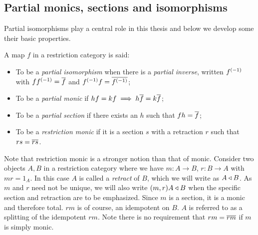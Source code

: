 \subsection{Partial monics, sections and isomorphisms} %
\label{sub:restricted_monics_sections_and_partial_isomorphisms}

Partial isomorphisms play a central role in this thesis and below we develop
some their basic properties.

\begin{definition}
  A map $f$ in a restriction category \X is said:
  \begin{itemize}
    \item To be a \emph{partial isomorphism} when there is a \emph{partial inverse}, written
      ${f}^{(-1)}$ with $f{f}^{(-1)} =\overline{f}$ and ${f}^{(-1)}f = \overline{{f}^{(-1)}}$;
    \item To be a \emph{partial monic} if $h f = k f \implies h \overline{f} = k \overline{f}$;
    \item To be a \emph{partial section} if there exists an  $h$ such that $f h = \overline{f}$;
    \item To be a \emph{restriction monic} if it is a section $s$ with a retraction
      $r$ such that $r s = \overline{r s}$.
  \end{itemize}
\end{definition}

Note that restriction monic is a stronger notion than that of monic. Consider two objects $A, B$
in a restriction category where we have $m: A\to B$, $r:B \to A$ with $m r = 1_A$. In this case
$A$ is called a \emph{retract} of $B$, which we will write as $A\triangleleft B$. As $m$ and $r$ need
not be unique, we will also write $(m,r) A \triangleleft B$ when the specific section and retraction
are to be emphasized. Since $m$ is a section,
it is a monic and therefore total. $r m$ is of course, an idempotent on $B$. $A$ is referred to as
a splitting of the idempotent $r m$. Note there is no requirement that $r m = \overline{r m}$ if $m$ is
simply monic.

